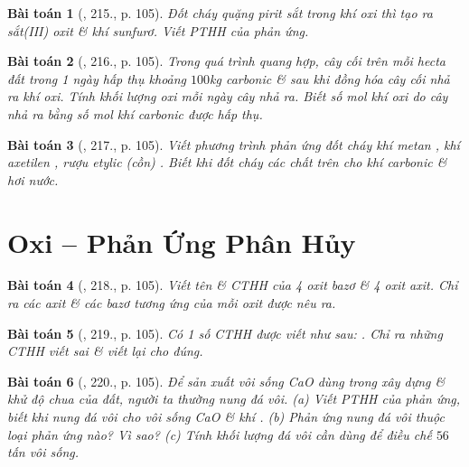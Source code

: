 \documentclass{article}
\newtheorem{baitoan}{Bài toán}
\begin{document}
\begin{baitoan}[\cite{An_400_BT_Hoa_Hoc_8_2020}, 215., p. 105]
	Đốt cháy quặng pirit sắt \emph{} trong khí oxi thì tạo ra sắt(III) oxit \& khí sunfurơ. Viết PTHH của phản ứng.
\end{baitoan}

\begin{baitoan}[\cite{An_400_BT_Hoa_Hoc_8_2020}, 216., p. 105]
	Trong quá trình quang hợp, cây cối trên mỗi hecta đất trong 1 ngày hấp thụ khoảng $100$\emph{kg} carbonic \& sau khi đồng hóa cây cối nhả ra khí oxi. Tính khối lượng oxi mỗi ngày cây nhả ra. Biết số mol khí oxi do cây nhả ra bằng số mol khí carbonic được hấp thụ.
\end{baitoan}

\begin{baitoan}[\cite{An_400_BT_Hoa_Hoc_8_2020}, 217., p. 105]
	Viết phương trình phản ứng đốt cháy khí metan \emph{}, khí axetilen \emph{}, rượu etylic (cồn) \emph{}. Biết khi đốt cháy các chất trên cho khí carbonic \& hơi nước.
\end{baitoan}


\section{Oxi -- Phản Ứng Phân Hủy}

\begin{baitoan}[\cite{An_400_BT_Hoa_Hoc_8_2020}, 218., p. 105]
	Viết tên \& CTHH của 4 oxit bazơ \& 4 oxit axit. Chỉ ra các axit \& các bazơ tương ứng của mỗi oxit được nêu ra.
\end{baitoan}

\begin{baitoan}[\cite{An_400_BT_Hoa_Hoc_8_2020}, 219., p. 105]
	Có 1 số CTHH được viết như sau: \emph{}. Chỉ ra những CTHH viết sai \& viết lại cho đúng.
\end{baitoan}

\begin{baitoan}[\cite{An_400_BT_Hoa_Hoc_8_2020}, 220., p. 105]
	Để sản xuất vôi sống \emph{CaO} dùng trong xây dựng \& khử độ chua của đất, người ta thường nung đá vôi. (a) Viết PTHH của phản ứng, biết khi nung đá vôi cho vôi sống \emph{CaO} \& khí \emph{}. (b) Phản ứng nung đá vôi thuộc loại phản ứng nào? Vì sao? (c) Tính khối lượng đá vôi cần dùng để điều chế $56$ tấn vôi sống.
\end{baitoan}
\end{document}
